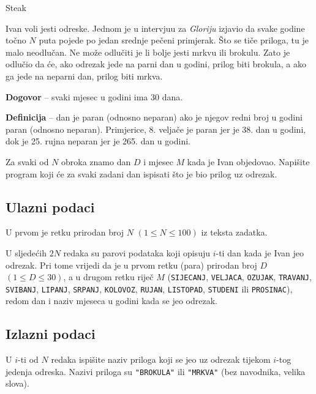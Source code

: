 \begin{statement}[
  problempoints=20,
  timelimit=1 sekunda,
  memorylimit=512 MiB,
]{Steak}


Ivan voli jesti odreske. Jednom je u intervjuu za \textit{Gloriju} izjavio da svake
godine točno $N$ puta pojede po jedan srednje pečeni primjerak. Što se tiče
priloga, tu je malo neodlučan. Ne može odlučiti je li bolje jesti mrkvu ili
brokulu. Zato je odlučio da će, ako odrezak jede na parni dan u godini,
prilog biti brokula, a ako ga jede na neparni dan, prilog biti mrkva.

\textbf{Dogovor} -- svaki mjesec u godini ima $30$ dana.

\textbf{Definicija} -- dan je paran (odnosno neparan) ako je njegov redni broj
u godini paran (odnosno neparan). Primjerice, 8. veljače je paran jer je 38.
dan u godini, dok je 25.  rujna neparan jer je 265. dan u godini.

Za svaki od $N$ obroka znamo dan $D$ i mjesec $M$ kada je Ivan objedovao.
Napišite program koji će za svaki zadani dan ispisati što je bio prilog uz
odrezak.

\subsection*{Ulazni podaci}
U prvom je retku prirodan broj $N$ $(1 \le N \le 100)$ iz teksta zadatka.

U sljedećih $2N$ redaka su parovi podataka koji opisuju $i$-ti dan kada je Ivan
jeo odrezak. Pri tome vrijedi da je u prvom retku (para) prirodan broj $D$
$(1 \le D \le 30)$, a u drugom retku riječ $M$ (\texttt{SIJECANJ},
\texttt{VELJACA}, \texttt{OZUJAK}, \texttt{TRAVANJ}, \texttt{SVIBANJ},
\texttt{LIPANJ}, \texttt{SRPANJ}, \texttt{KOLOVOZ}, \texttt{RUJAN},
\texttt{LISTOPAD}, \texttt{STUDENI} ili \texttt{PROSINAC}), redom dan i naziv
mjeseca u godini kada se jeo odrezak.

\subsection*{Izlazni podaci}
U $i$-ti od $N$ redaka ispišite naziv priloga koji se jeo uz odrezak tijekom
$i$-tog jedenja odreska. Nazivi priloga su \texttt{"BROKULA"} ili
\texttt{"MRKVA"} (bez navodnika, velika slova).



\end{statement}
